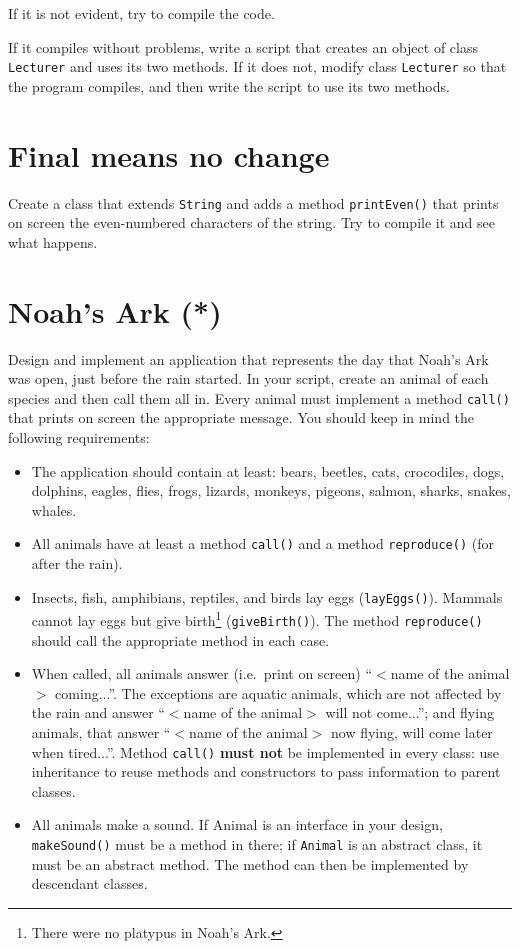 \documentclass{article}
\begin{document}
If it is not evident, try to compile the code. 

If it compiles without problems, write a script that creates an object
of class \verb+Lecturer+ and uses its two methods. If it does not,
modify class \verb+Lecturer+ so that the program compiles, and then
write the script to use its two methods. 


\section{Final means no change}
\label{sec:final-means-no}

Create a class that extends \verb+String+ and adds a method
\verb+printEven()+ that prints on screen the even-numbered characters
of the string. Try to compile it and see what happens. 

\section{Noah's Ark (*)}
\label{sec:noahs-ark}

Design and implement an application that represents the day that
Noah's Ark was open, just before the rain started. In your script,
create an animal of each species and then call them all in. Every animal
must implement a method \verb+call()+ that prints on screen the
appropriate message. You should keep in mind the following
requirements: 

\begin{itemize}
\item The application should contain at least: bears, beetles, cats,
  crocodiles, dogs, dolphins, eagles, flies, frogs, lizards, monkeys,
  pigeons, salmon, sharks, snakes, whales.
\item All animals have at least a method \verb+call()+ and a method
  \verb+reproduce()+ (for after the rain). 
\item Insects, fish, amphibians, reptiles, and birds lay eggs
  (\verb+layEggs()+). Mammals cannot lay eggs but give
  birth\footnote{There were no platypus in Noah's Ark.}
  (\verb+giveBirth()+). The method \verb+reproduce()+ 
  should call the appropriate method in each case.
\item When called, all animals answer (i.e.~print on screen) ``$<$name of
  the animal$>$ coming...''. The exceptions are aquatic animals,
  which are not affected by the rain and answer ``$<$name of the animal$>$
  will not come...''; and flying animals, that answer ``$<$name of
  the animal$>$ now flying, will come later when tired...''. 
  Method \verb+call()+ \textbf{must not} be implemented in
  every class: use inheritance to reuse methods and constructors to
  pass information to parent classes.
\item All animals make a sound. If Animal is an interface in your
  design, \verb+makeSound()+ must be a method in there; if
  \verb+Animal+ is an abstract class, it must be an abstract
  method. The method can then be implemented by descendant classes.
\end{itemize}
\end{document}
